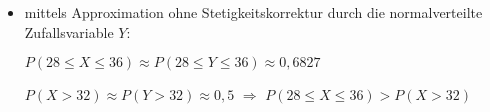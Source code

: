 \begin{langesbeispiel}
{\begin{itemize}
	$P(28\leq X\leq 36)\approx P(27,5\leq Y\leq 36,5)\approx 0,7394$
	
	$P(X>32)\approx P(Y>32,5)\approx 0,4503$ $\Rightarrow$ $P(28\leq X\leq 36)>P(X>32)$
	
	\item mittels Approximation ohne Stetigkeitskorrektur durch die normalverteilte Zufallsvariable $Y$:
	
	$P(28\leq X\leq 36)\approx P(28\leq Y\leq 36)\approx 0,6827$
	
	$P(X>32)\approx P(Y>32)\approx 0,5$ $\Rightarrow$ $P(28\leq X\leq 36)>P(X>32)$
\end{itemize}
}
\end{langesbeispiel}